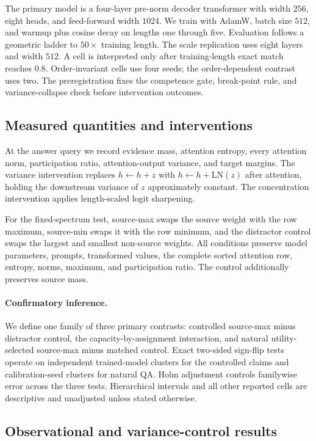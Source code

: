 \documentclass[letterpaper]{article} %
\begin{document}
The primary model is a four-layer pre-norm decoder transformer with width $256$, eight heads, and feed-forward
width $1024$. We train with AdamW, batch size $512$, and warmup plus cosine decay on lengths one through five.
Evaluation follows a geometric ladder to $50\times$ training length. The scale replication uses eight layers
and width $512$. A cell is interpreted only after training-length exact match reaches $0.8$. Order-invariant
cells use four seeds; the order-dependent contrast uses two. The preregistration fixes the competence gate,
break-point rule, and variance-collapse check before intervention outcomes.

\subsection{Measured quantities and interventions}

At the answer query we record evidence mass, attention entropy, every attention norm, participation ratio,
attention-output variance, and target margins. The variance intervention replaces
$h\leftarrow h+z$ with $h\leftarrow h+\mathrm{LN}(z)$ after attention, holding the downstream variance of
$z$ approximately constant. The concentration intervention applies length-scaled logit sharpening.

For the fixed-spectrum test, source-max swaps the source weight with the row maximum, source-min swaps it
with the row minimum, and the distractor control swaps the largest and smallest non-source weights. All
conditions preserve model parameters, prompts, transformed values, the complete sorted attention row,
entropy, norms, maximum, and participation ratio. The control additionally preserves source mass.

\paragraph{Confirmatory inference.}
We define one family of three primary contrasts: controlled source-max minus distractor control, the
capacity-by-assignment interaction, and natural utility-selected source-max minus matched control. Exact
two-sided sign-flip tests operate on independent trained-model clusters for the controlled claims and
calibration-seed clusters for natural QA. Holm adjustment controls familywise error across the three tests.
Hierarchical intervals and all other reported cells are descriptive and unadjusted unless stated otherwise.

\subsection{Observational and variance-control results}
\end{document}
